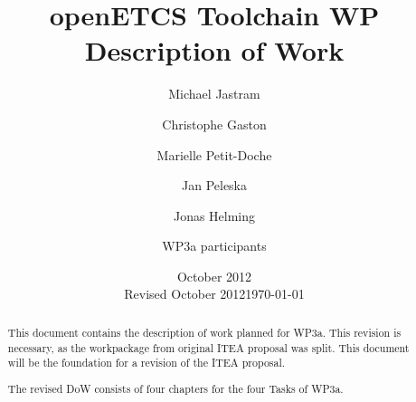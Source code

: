 \documentclass{template/openetcs_article}
\begin{document}
\frontmatter
{}




\title{openETCS Toolchain WP Description of Work}


\date{October 2012\\Revised October 2012}
\date{\today}


\author{Michael Jastram}


\author{Christophe Gaston}

  
\author{Marielle Petit-Doche}

  
\author{Jan Peleska}


\author{Jonas Helming}


\author{WP3a participants}

    



\begin{abstract}
This document contains the description of work planned for WP3a.  This revision is necessary, as the workpackage from original ITEA proposal was split.  This document will be the foundation for a revision of the ITEA proposal.

The revised DoW consists of four chapters for the four Tasks of WP3a.

\end{abstract}
\end{document}
